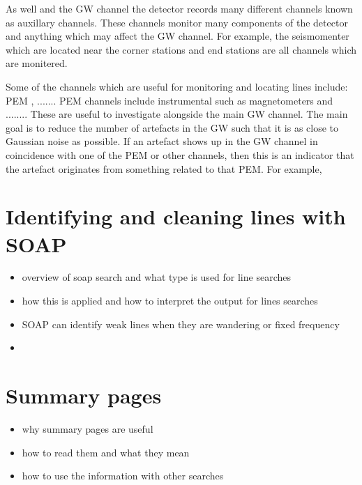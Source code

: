 As well and the \ac{GW} channel the detector records many different channels known as auxillary channels. 
These channels monitor many components of the detector and anything which may affect the \ac{GW} channel.
For example, the seismomenter which are located near the corner stations and end stations are all channels which are monitered. 

Some of the channels which are useful for monitoring and locating lines include: \ac{PEM} , .......
\ac{PEM} channels include instrumental such as magnetometers and ........
These are useful to investigate alongside the main \ac{GW} channel.
The main goal is to reduce the number of artefacts in the \ac{GW} such that it is as close to Gaussian noise as possible.
If an artefact shows up in the \ac{GW} channel in coincidence with one of the \ac{PEM} or other channels, then this is an indicator that the artefact originates from something related to that \ac{PEM}.
For example, 


\section{Identifying and cleaning lines with SOAP}

\begin{itemize}
    \item overview of soap search and what type is used for line searches
    \item how this is applied and how to interpret the output for lines searches
    \item SOAP can identify weak lines when they are wandering or fixed frequency
    \item 
\end{itemize}


\section{Summary pages}

\begin{itemize}
    \item why summary pages are useful 
    \item how to read them and what they mean
    \item how to use the information with other searches
\end{itemize}
